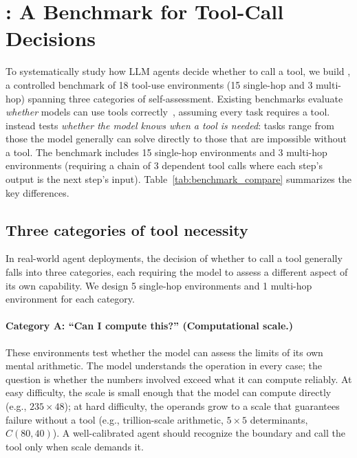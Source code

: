 \section{\benchmark{}: A Benchmark for Tool-Call Decisions}
\label{sec:benchmark}


To systematically study how LLM agents decide whether to call a tool, we build \benchmark{}, a controlled benchmark of 18 tool-use environments (15 single-hop and 3 multi-hop) spanning three categories of self-assessment. Existing benchmarks evaluate \emph{whether} models can use tools correctly~\citep{zhuang2023toolqa, li2023api}, assuming every task requires a tool. \benchmark{} instead tests \emph{whether the model knows when a tool is needed}: tasks range from those the model generally can solve directly to those that are impossible without a tool. The benchmark includes 15 single-hop environments and 3 multi-hop environments (requiring a chain of 3 dependent tool calls where each step's output is the next step's input). Table~\ref{tab:benchmark_compare} summarizes the key differences.


\subsection{Three categories of tool necessity}

In real-world agent deployments, the decision of whether to call a tool generally falls into three categories, each requiring the model to assess a different aspect of its own capability. We design 5 single-hop environments and 1 multi-hop environment for each category.
\vspace{-5pt}
\paragraph{Category A: ``Can I compute this?'' (Computational scale.)}
These environments test whether the model can assess the limits of its own mental arithmetic. The model understands the operation in every case; the question is whether the numbers involved exceed what it can compute reliably. At easy difficulty, the scale is small enough that the model can compute directly (e.g., $235 \times 48$); at hard difficulty, the operands grow to a scale that guarantees failure without a tool (e.g., trillion-scale arithmetic, $5\times 5$ determinants, $C(80,40)$). A well-calibrated agent should recognize the boundary and call the tool only when scale demands it.
\vspace{-5pt}
